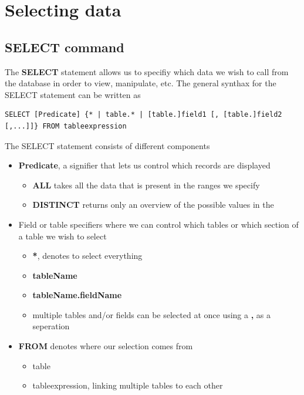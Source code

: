\documentclass{article}
\begin{document}
\section{Selecting data}

\subsection{SELECT command}

The \textbf{SELECT} statement allows us to specifiy which data we wish to call from the database in order to view, manipulate, etc.
The general synthax for the SELECT statement can be written as 

\begin{lstlisting}[frame=single]
    SELECT [Predicate] {* | table.* | [table.]field1 [, [table.]field2 [,...]]} FROM tableexpression
\end{lstlisting}

The SELECT statement consists of different components
\begin{itemize}
    \item \textbf{Predicate}, a signifier that lets us control which records are displayed
    \begin{itemize}
        \item \textbf{ALL} takes all the data that is present in the ranges we specify
        \item \textbf{DISTINCT} returns only an overview of the possible values in the 
    \end{itemize}
    \item Field or table specifiers where we can control which tables or which section of a table we wish to select 
    \begin{itemize}
        \item \textbf{*}, denotes to select everything 
        \item \textbf{tableName}
        \item \textbf{tableName.fieldName}
        \item multiple tables and/or fields can be selected at once using a \textbf{,} as a seperation
    \end{itemize} 
    \item \textbf{FROM} denotes where our selection comes from 
    \begin{itemize}
        \item table
        \item tableexpression, linking multiple tables to each other
    \end{itemize} 
\end{itemize}
\end{document}
